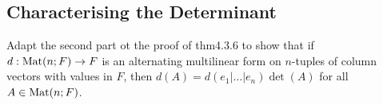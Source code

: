 \subsection{Characterising the Determinant}
\item Adapt the second part ot the proof of thm4.3.6 to show that if $d : \text{Mat}(n; F) \rightarrow F$ is an alternating multilinear form on $n$-tuples of column vectors with values in $F$, then $d(A) = d(e_1|\dots|e_n)\det(A)$ for all $A \in \text{Mat}(n; F)$.